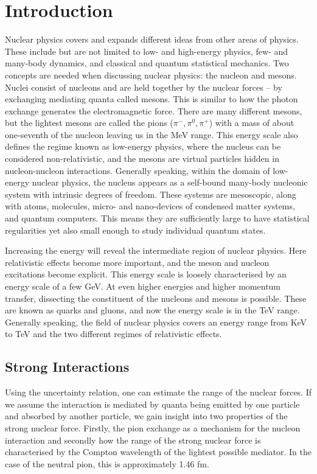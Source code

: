 
\mainmatter
\chapter{Introduction}
Nuclear physics covers and expands different ideas from other areas of physics. These include but are not limited to low- and high-energy physics, few- and many-body dynamics, and classical and quantum statistical mechanics. Two concepts are needed when discussing nuclear physics: the nucleon and mesons. Nuclei consist of nucleons and are held together by the nuclear forces -- by exchanging mediating quanta called mesons. This is similar to how the photon exchange generates the electromagnetic force. There are many different mesons, but the lightest mesons are called the pions ($\pi^-,\pi^0,\pi^+$) with a mass of about one-seventh of the nucleon leaving us in the MeV range. This energy scale also defines the regime known as low-energy physics, where the nucleus can be considered non-relativistic, and the mesons are virtual particles hidden in nucleon-nucleon interactions.
Generally speaking, within the domain of low-energy nuclear physics, the nucleus appears as a self-bound many-body nucleonic system with intrinsic degrees of freedom. These systems are mesoscopic, along with atoms, molecules, micro- and nano-devices of condensed matter systems, and quantum computers. This means they are sufficiently large to have statistical regularities yet also small enough to study individual quantum states.

Increasing the energy will reveal the intermediate region of nuclear physics. Here relativistic effects become more important, and the meson and nucleon excitations become explicit. This energy scale is loosely characterised by an energy scale of a few GeV. At even higher energies and higher momentum transfer, dissecting the constituent of the nucleons and mesons is possible. These are known as quarks and gluons, and now the energy scale is in the TeV range. Generally speaking, the field of nuclear physics covers an energy range from KeV to TeV and the two different regimes of relativistic effects. 
\section{Strong Interactions}
Using the uncertainty relation, one can estimate the range of the nuclear forces. If we assume the interaction is mediated by quanta being emitted by one particle and absorbed by another particle, we gain insight into two properties of the strong nuclear force. Firstly, the pion exchange as a mechanism for the nucleon interaction and secondly how the range of the strong nuclear force is characterised by the Compton wavelength of the lightest possible mediator. In the case of the neutral pion, this is approximately 1.46 fm. 

